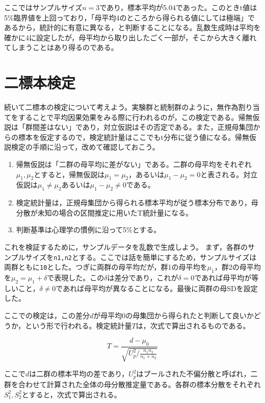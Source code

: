 \documentclass[
  a4paper,
]{ltjsbook}
\providecommand{\tightlist}{%
  \setlength{\itemsep}{0pt}\setlength{\parskip}{0pt}}
\begin{document}
ここではサンプルサイズ\(n=3\)であり，標本平均が5.04であった。このときt値は5\%臨界値を上回っており，「母平均4のところから得られる値にしては極端」であるから，統計的に有意に異なる，と判断することになる。乱数生成時は平均を確かに4に設定したが，母平均から取り出したごく一部が，そこから大きく離れてしまうことはあり得るのである。

\section{二標本検定}\label{ux4e8cux6a19ux672cux691cux5b9a}

続いて二標本の検定について考えよう。実験群と統制群のように，無作為割り当てをすることで平均因果効果をみる際に行われるのが，この検定である。帰無仮説は「群間差はない」であり，対立仮説はその否定である。また，正規母集団からの標本を仮定するので，検定統計量はここでもt分布に従う値になる。帰無仮説検定の手順に沿って，改めて確認しておこう。

\begin{enumerate}
\def\labelenumi{\arabic{enumi}.}
\tightlist
\item
  帰無仮説は「二群の母平均に差がない」である。二群の母平均をそれぞれ\(\mu_1,\mu_2\)とすると，帰無仮説は\(\mu_1 = \mu_2\)，あるいは\(\mu_1 - \mu_2 = 0\)と表される。対立仮説は\(\mu_1 \neq \mu_2\)あるいは\(\mu_1-\mu_2 \neq 0\)である。
\item
  検定統計量は，正規母集団から得られる標本平均が従う標本分布であり，母分散が未知の場合の区間推定に用いたT統計量になる。
\item
  判断基準は心理学の慣例に沿って5\%とする。
\end{enumerate}

これを検証するために，サンプルデータを乱数で生成しよう。
まず，各群のサンプルサイズを\texttt{n1,n2}とする。ここでは話を簡単にするため，サンプルサイズは両群ともに\texttt{10}とした。つぎに両群の母平均だが，群1の母平均を\(\mu_1\)，群2の母平均を\(\mu_2 = \mu_1 + \delta\)で表現した。この\(\delta\)は差分であり，これが\(\delta=0\)であれば母平均が等しいこと，\(\delta \neq 0\)であれば母平均が異なることになる。最後に両群の母SDを設定した。

ここでの検定は，この差分\(d\)が母平均0の母集団から得られたと判断して良いかどうか，という形で行われる。検定統計量\(T\)は，次式で算出されるものである。

\[ T = \frac{d - \mu_0}{\sqrt{U^2_p/\frac{n_1n_2}{n_1+n_2}}}\]

ここで\(d\)は二群の標本平均の差であり，\(U^2_p\)はプールされた不偏分散と呼ばれ，二群を合わせて計算された全体の母分散推定量である。各群の標本分散をそれぞれ\(S^2_1, S^2_2\)とすると，次式で算出される。
\end{document}
